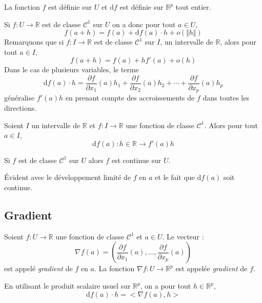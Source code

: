 \documentclass[a4paper,10pt]{report}
\begin{document}
\newpage

\begin{rems}
\item La fonction $f$ est définie sur $U$ et $\textrm{d}f$ est définie sur $\mathbb{R}^p$ tout entier.
\item Si $f : U \rightarrow \mathbb{R}$ est de classe $\mathcal{C}^1$ sur $U$ on a donc pour tout $a \in U$,
$$ f(a+h)=f(a) + \textrm{d}f(a) \cdot h + o (\Vert h \Vert)$$
Remarquons que si $f : I \rightarrow\mathbb{R}$ est de classe $\mathcal{C}^1$ sur $I$, un intervalle de $\mathbb{R}$, alors pour tout $a \in I$,
$$ f(a+h)=f(a) + h f'(a) + o(h)$$
Dans le cas de plusieurs variables, le terme 
$$   \textrm{d}f(a) \cdot h = \dfrac{\partial f}{\partial x_1}(a) h_1 + \dfrac{\partial f}{\partial x_2}(a) h_2 + \cdots + \dfrac{\partial f}{\partial x_p}(a) h_p$$
généralise $f'(a)h$ en prenant compte des accroissements de $f$ dans toutes les directions.
\end{rems}

\begin{cor} Soient $I$ un intervalle de $\mathbb{R}$ et $f : I \rightarrow \mathbb{R}$ une fonction de classe $\mathcal{C}^1$. Alors pour tout $a \in I$, 
$$\textrm{d}f(a) : h \in \mathbb{R} \rightarrow f'(a)h$$
\end{cor}

\begin{prop} Si $f$ est de classe $\mathcal{C}^1$ sur $U$ alors $f$ est continue sur $U$.
\end{prop}

\begin{preuve} Évident avec le développement limité de $f$ en $a$ et le fait que $\textrm{d}f(a)$ soit continue.
\end{preuve}

\subsection{Gradient}

\begin{defin} Soient $f : U \rightarrow \mathbb{R}$ une fonction de classe $\mathcal{C}^1$ et $a \in U$. Le vecteur :
$$ \nabla f(a) = \left(\dfrac{\partial f}{\partial x_1}(a), \ldots,   \dfrac{\partial f}{\partial x_p}(a) \right) $$
est appelé \textit{gradient} de $f$ en $a$. La fonction $\nabla f : U \rightarrow \mathbb{R}^p$ est appelée \textit{gradient} de $f$.
\end{defin}

\begin{rem} En utilisant le produit scalaire usuel sur $\mathbb{R}^p$, on a pour tout $h \in \mathbb{R}^p$,
$$ \textrm{d}f(a) \cdot h = < \nabla f(a),h>$$
\end{rem}
\end{document}
